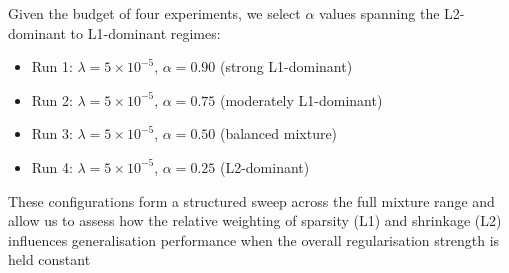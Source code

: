 {Given the budget of four experiments, we select $\alpha$ values spanning the L2-dominant to L1-dominant regimes:

\begin{itemize}
    \item Run 1: $\lambda = 5\times10^{-5}$, $\alpha = 0.90$ (strong L1-dominant)
    \item Run 2: $\lambda = 5\times10^{-5}$, $\alpha = 0.75$ (moderately L1-dominant)
    \item Run 3: $\lambda = 5\times10^{-5}$, $\alpha = 0.50$ (balanced mixture)
    \item Run 4: $\lambda = 5\times10^{-5}$, $\alpha = 0.25$ (L2-dominant)
\end{itemize}

These configurations form a structured sweep across the full mixture range and allow us 
to assess how the relative weighting of sparsity (L1) and shrinkage (L2) influences 
generalisation performance when the overall regularisation strength is held constant}


